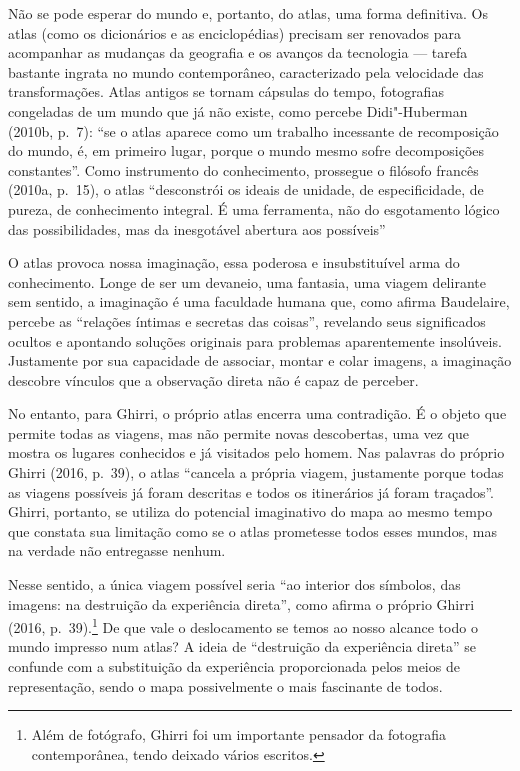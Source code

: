 Não se pode esperar do mundo e, portanto, do atlas, uma forma
definitiva. Os atlas (como os dicionários e as enciclopédias) precisam
ser renovados para acompanhar as mudanças da geografia e os avanços da
tecnologia --- tarefa bastante ingrata no mundo contemporâneo,
caracterizado pela velocidade das transformações. Atlas antigos se
tornam cápsulas do tempo, fotografias congeladas de um mundo que já não
existe, como percebe Didi"-Huberman (2010b, p.~7): ``se o atlas aparece
como um trabalho incessante de recomposição do mundo, é, em primeiro
lugar, porque o mundo mesmo sofre decomposições constantes''. Como
instrumento do conhecimento, prossegue o filósofo francês (2010a, p.~15), o atlas ``desconstrói os ideais de unidade, de especificidade, de
pureza, de conhecimento integral. É uma ferramenta, não do esgotamento
lógico das possibilidades, mas da inesgotável abertura aos possíveis''

O atlas provoca nossa imaginação, essa poderosa e insubstituível arma do
conhecimento. Longe de ser um devaneio, uma fantasia, uma viagem
delirante sem sentido, a imaginação é uma faculdade humana que, como
afirma Baudelaire, percebe as ``relações íntimas e secretas das
coisas'', revelando seus significados ocultos e apontando soluções
originais para problemas aparentemente insolúveis. Justamente por sua
capacidade de associar, montar e colar imagens, a imaginação descobre
vínculos que a observação direta não é capaz de perceber.

No entanto, para Ghirri, o próprio atlas encerra uma contradição. É o
objeto que permite todas as viagens, mas não permite novas descobertas,
uma vez que mostra os lugares conhecidos e já visitados pelo homem. Nas
palavras do próprio Ghirri (2016, p.~39), o atlas ``cancela a própria
viagem, justamente porque todas as viagens possíveis já foram descritas
e todos os itinerários já foram traçados''. Ghirri, portanto, se utiliza
do potencial imaginativo do mapa ao mesmo tempo que constata sua
limitação como se o atlas prometesse todos esses mundos, mas na verdade
não entregasse nenhum.

Nesse sentido, a única viagem possível seria ``ao interior dos símbolos,
das imagens: na destruição da experiência direta'', como afirma o
próprio Ghirri (2016, p.~39).\footnote{Além de fotógrafo, Ghirri foi um
  importante pensador da fotografia contemporânea, tendo deixado vários
  escritos.} De que vale o deslocamento se temos ao nosso alcance todo o
mundo impresso num atlas? A ideia de ``destruição da experiência
direta'' se confunde com a substituição da experiência proporcionada
pelos meios de representação, sendo o mapa possivelmente o mais
fascinante de todos.

